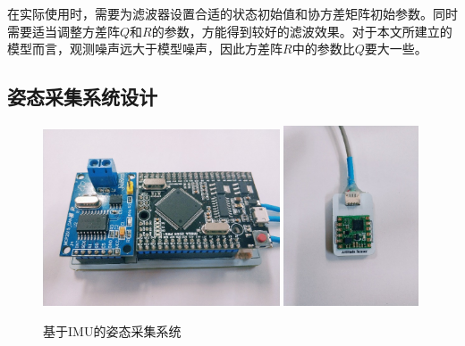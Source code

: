 在实际使用时，需要为滤波器设置合适的状态初始值和协方差矩阵初始参数。同时需要适当调整方差阵$Q$和$R$的参数，方能得到较好的滤波效果。对于本文所建立的模型而言，观测噪声远大于模型噪声，因此方差阵$R$中的参数比$Q$要大一些。

\subsection{姿态采集系统设计}


\begin{figure}[htb]
    \label{fig:sub1}{\includegraphics[width=7cm]{fig/f40.jpg}}\quad
    \label{fig:sub2}{\includegraphics[width=4cm]{fig/f41.jpg}}
    \caption{基于IMU的姿态采集系统}
    \label{fig:subfigss}
\end{figure}

